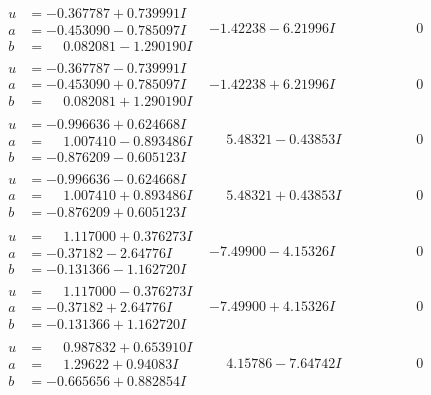 \documentclass[1p]{elsarticle_modified}
\theoremstyle{definition}
\begin{document}
$$\begin{array}{c|c|c}
\begin{aligned}
u &= -0.367787 + 0.739991 I \\
a &= -0.453090 - 0.785097 I \\
b &= \phantom{-}0.082081 - 1.290190 I\end{aligned}
 & -1.42238 - 6.21996 I & \phantom{-0.000000 } 0 \\ \hline\begin{aligned}
u &= -0.367787 - 0.739991 I \\
a &= -0.453090 + 0.785097 I \\
b &= \phantom{-}0.082081 + 1.290190 I\end{aligned}
 & -1.42238 + 6.21996 I & \phantom{-0.000000 } 0 \\ \hline\begin{aligned}
u &= -0.996636 + 0.624668 I \\
a &= \phantom{-}1.007410 - 0.893486 I \\
b &= -0.876209 - 0.605123 I\end{aligned}
 & \phantom{-}5.48321 - 0.43853 I & \phantom{-0.000000 } 0 \\ \hline\begin{aligned}
u &= -0.996636 - 0.624668 I \\
a &= \phantom{-}1.007410 + 0.893486 I \\
b &= -0.876209 + 0.605123 I\end{aligned}
 & \phantom{-}5.48321 + 0.43853 I & \phantom{-0.000000 } 0 \\ \hline\begin{aligned}
u &= \phantom{-}1.117000 + 0.376273 I \\
a &= -0.37182 - 2.64776 I \\
b &= -0.131366 - 1.162720 I\end{aligned}
 & -7.49900 - 4.15326 I & \phantom{-0.000000 } 0 \\ \hline\begin{aligned}
u &= \phantom{-}1.117000 - 0.376273 I \\
a &= -0.37182 + 2.64776 I \\
b &= -0.131366 + 1.162720 I\end{aligned}
 & -7.49900 + 4.15326 I & \phantom{-0.000000 } 0 \\ \hline\begin{aligned}
u &= \phantom{-}0.987832 + 0.653910 I \\
a &= \phantom{-}1.29622 + 0.94083 I \\
b &= -0.665656 + 0.882854 I\end{aligned}
 & \phantom{-}4.15786 - 7.64742 I & \phantom{-0.000000 } 0 \\ \hline\begin{aligned}

\end{aligned}
\end{array}$$
\end{document}
